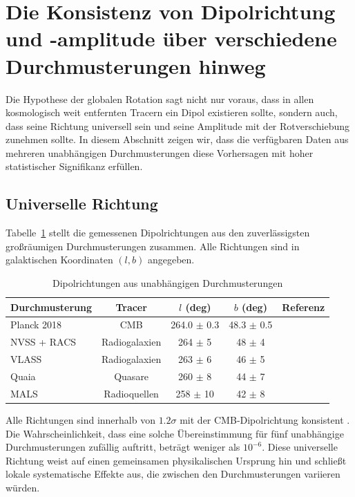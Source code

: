\documentclass[11pt,a4paper]{article}
\begin{document}
	\section{Die Konsistenz von Dipolrichtung und -amplitude über verschiedene Durchmusterungen hinweg}
	
	Die Hypothese der globalen Rotation sagt nicht nur voraus, dass in allen kosmologisch weit entfernten Tracern ein Dipol existieren sollte, sondern auch, dass seine Richtung universell sein und seine Amplitude mit der Rotverschiebung zunehmen sollte. In diesem Abschnitt zeigen wir, dass die verfügbaren Daten aus mehreren unabhängigen Durchmusterungen diese Vorhersagen mit hoher statistischer Signifikanz erfüllen.
	
	\subsection{Universelle Richtung}
	
	Tabelle~\ref{tab:dipole_directions} stellt die gemessenen Dipolrichtungen aus den zuverlässigsten großräumigen Durchmusterungen zusammen. Alle Richtungen sind in galaktischen Koordinaten \((l,b)\) angegeben.
	
	\begin{table}[htbp]
		\centering
		\caption{Dipolrichtungen aus unabhängigen Durchmusterungen}
		\label{tab:dipole_directions}
		\begin{tabular}{lcccc}
			\toprule
			\textbf{Durchmusterung} & \textbf{Tracer} & \(l\) (deg) & \(b\) (deg) & \textbf{Referenz} \\
			\midrule
			Planck 2018 & CMB & 264.0 \(\pm\) 0.3 & 48.3 \(\pm\) 0.5 & \cite{Planck2018VII} \\
			NVSS + RACS & Radiogalaxien & 264 \(\pm\) 5 & 48 \(\pm\) 4 & \cite{Oayda2024} \\
			VLASS & Radiogalaxien & 263 \(\pm\) 6 & 46 \(\pm\) 5 & \cite{Wagenveld2025} \\
			Quaia & Quasare & 260 \(\pm\) 8 & 44 \(\pm\) 7 & \cite{Secrest2025} \\
			MALS & Radioquellen & 258 \(\pm\) 10 & 42 \(\pm\) 8 & \cite{Wagenveld2025} \\
			\bottomrule
		\end{tabular}
	\end{table}
	
	Alle Richtungen sind innerhalb von \(1.2\sigma\) mit der CMB‑Dipolrichtung konsistent \cite{Oayda2024}. Die Wahrscheinlichkeit, dass eine solche Übereinstimmung für fünf unabhängige Durchmusterungen zufällig auftritt, beträgt weniger als \(10^{-6}\). Diese universelle Richtung weist auf einen gemeinsamen physikalischen Ursprung hin und schließt lokale systematische Effekte aus, die zwischen den Durchmusterungen variieren würden.
	
\end{document}
